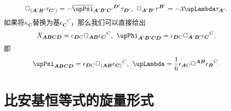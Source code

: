 \begin{equation*}
	\Box _{(\boldsymbol{A} '\boldsymbol{B} '} \tau _{\boldsymbol{C} ')} =-\overline{\upPsi }{_{\boldsymbol{A} '\boldsymbol{B} '\boldsymbol{C} '}}^{\boldsymbol{D} '} \tau _{\boldsymbol{D} '} ,\kern+0.4em \Box _{\boldsymbol{A} '\boldsymbol{B} '} \tau ^{\boldsymbol{B} '} =-3\upLambda \tau _{\boldsymbol{A} '} .
\end{equation*}
如果将$\kappa _{\boldsymbol{C}}$替换为基$\epsilon {_{\boldsymbol{C}}}^{C}$，那么我们可以直接给出
\begin{equation*}
	X_{\boldsymbol{ABCD}} =\epsilon _{\boldsymbol{D} C} \Box _{\boldsymbol{AB}} \epsilon {_{\boldsymbol{C}}}^{C} ,\kern+0.4em \upPhi _{\boldsymbol{A} '\boldsymbol{B} '\boldsymbol{CD}} =\epsilon _{\boldsymbol{D} C} \Box _{\boldsymbol{A} '\boldsymbol{B} '} \epsilon {_{\boldsymbol{C}}}^{C} .
\end{equation*}
即
\begin{equation*}
	\upPsi _{\boldsymbol{ABCD}} =\epsilon _{\boldsymbol{D} C} \Box _{(\boldsymbol{AB}} \epsilon {_{\boldsymbol{C})}}^{C} ,\kern+0.4em \upLambda =\frac{1}{6} \epsilon _{\boldsymbol{A} C} \Box ^{\boldsymbol{AB}} \epsilon {_{\boldsymbol{B}}}^{C} .
\end{equation*}


\section{比安基恒等式的旋量形式}

